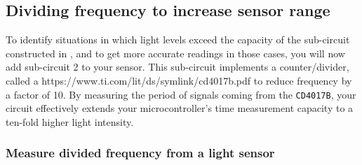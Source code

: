 \subsection{Dividing frequency to increase sensor range}
To identify situations in which light levels exceed the capacity of the sub-circuit constructed in , and to get more accurate readings in those cases, you will now add sub-circuit 2 to your sensor.
This sub-circuit implements a counter/divider, called a  {https://www.ti.com/lit/ds/symlink/cd4017b.pdf} to reduce frequency by a factor of 10.
By measuring the period of signals coming from the \texttt{CD4017B}, your circuit effectively extends your microcontroller's time measurement capacity to a ten-fold higher light intensity. 

\subsubsection{\howto Measure divided frequency from a light sensor}
